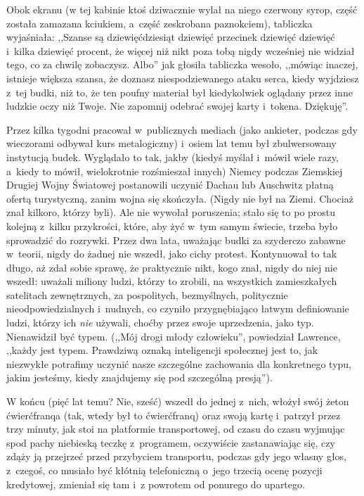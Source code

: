 \documentclass[oneside,polish,11pt,rmheadings]{mwbk}
\begin{document}
Obok ekranu (w tej kabinie ktoś dziwacznie wylał na niego czerwony syrop, część została zamazana kciukiem, a~część zeskrobana paznokciem), tabliczka wyjaśniała: ,,Szanse są dziewięćdziesiąt dziewięć przecinek dziewięć dziewięć i~kilka dziewięć procent, że więcej niż nikt poza tobą nigdy wcześniej nie widział tego, co za chwilę zobaczysz. Albo'' jak głosiła tabliczka wesoło, ,,mówiąc inaczej, istnieje większa szansa, że doznasz niespodziewanego ataku serca, kiedy wyjdziesz z~tej budki, niż to, że ten poufny materiał był kiedykolwiek oglądany przez inne ludzkie oczy niż Twoje. Nie zapomnij odebrać swojej karty i~tokena. Dziękuję''. 

Przez kilka tygodni pracował w~publicznych mediach (jako ankieter, podczas gdy wieczorami odbywał kurs metalogiczny) i~osiem lat temu był zbulwersowany instytucją budek. Wyglądało to tak, jakby (kiedyś myślał i~mówił wiele razy, a~kiedy to mówił, wielokrotnie rozśmieszał innych) Niemcy podczas Ziemskiej Drugiej Wojny Światowej postanowili uczynić Dachau lub Auschwitz płatną ofertą turystyczną, zanim wojna się skończyła. (Nigdy nie był na Ziemi. Chociaż znał kilkoro, którzy byli). Ale nie wywołał poruszenia; stało się to po prostu kolejną z~kilku przykrości, które, aby żyć w~tym samym świecie, trzeba było sprowadzić do rozrywki. Przez dwa lata, uważając budki za szyderczo zabawne w~teorii, nigdy do żadnej nie wszedł, jako cichy protest. Kontynuował to tak długo, aż zdał sobie sprawę, że praktycznie nikt, kogo znał, nigdy do niej nie wszedł: uważali miliony ludzi, którzy to zrobili, na wszystkich zamieszkałych satelitach zewnętrznych, za pospolitych, bezmyślnych, politycznie nieodpowiedzialnych i~nudnych, co czyniło przygnębiająco łatwym definiowanie ludzi, którzy ich \textit{nie }używali, choćby przez swoje uprzedzenia, jako typ. Nienawidził być typem. (,,Mój drogi młody człowieku'', powiedział Lawrence, ,,każdy jest typem. Prawdziwą oznaką inteligencji społecznej jest to, jak niezwykłe potrafimy uczynić nasze szczególne zachowania dla konkretnego typu, jakim jesteśmy, kiedy znajdujemy się pod szczególną presją''). 

W końcu (pięć lat temu? Nie, sześć) wszedł do jednej z~nich, włożył swój żeton ćwierćfranqa (tak, wtedy był to ćwierćfranq) oraz swoją kartę i~patrzył przez trzy minuty, jak stoi na platformie transportowej, od czasu do czasu wyjmując spod pachy niebieską teczkę z~programem, oczywiście zastanawiając się, czy zdąży ją przejrzeć przed przybyciem transportu, podczas gdy jego własny głos, z~czegoś, co musiało być kłótnią telefoniczną o~jego trzecią ocenę pozycji kredytowej, zmieniał się tam i~z powrotem od ponurego do upartego. 
\end{document}

